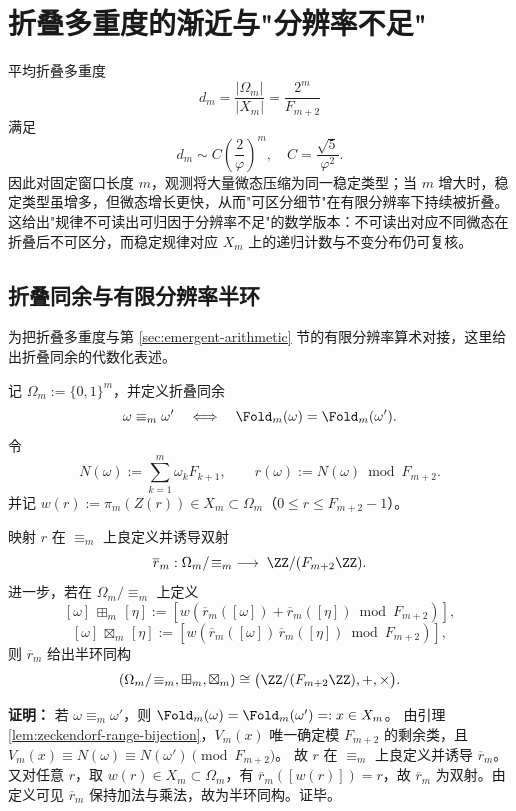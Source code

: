 \section{折叠多重度的渐近与"分辨率不足"}\label{app:fold-multiplicity}\label{app:fold_multiplicity}

平均折叠多重度
\[
d_m=\frac{|\Omega_m|}{|X_m|}=\frac{2^m}{F_{m+2}}
\]
满足
\[
d_m\sim C\left(\frac{2}{\varphi}\right)^m,\quad C=\frac{\sqrt5}{\varphi^2}.
\]
因此对固定窗口长度 $m$，观测将大量微态压缩为同一稳定类型；当 $m$ 增大时，稳定类型虽增多，但微态增长更快，从而"可区分细节"在有限分辨率下持续被折叠。这给出"规律不可读出可归因于分辨率不足"的数学版本：不可读出对应不同微态在折叠后不可区分，而稳定规律对应 $X_m$ 上的递归计数与不变分布仍可复核。

\subsection{折叠同余与有限分辨率半环}
为把折叠多重度与第 \ref{sec:emergent-arithmetic} 节的有限分辨率算术对接，这里给出折叠同余的代数化表述。

\begin{definition}[折叠同余与值模映射]
记 $\Omega_m:=\{0,1\}^m$，并定义折叠同余
\[
\omega\equiv_m\omega'\quad\Longleftrightarrow\quad\Fold_m(\omega)=\Fold_m(\omega').
\]
令
\[
N(\omega):=\sum_{k=1}^m \omega_k F_{k+1},
\qquad
r(\omega):=N(\omega)\bmod F_{m+2}.
\]
并记 $w(r):=\pi_m(Z(r))\in X_m\subset\Omega_m$（$0\le r\le F_{m+2}-1$）。
\end{definition}

\begin{theorem}[折叠同余的模半环表示]
\label{thm:fold-congruence-mod-semirings}
映射 $r$ 在 $\equiv_m$ 上良定义并诱导双射
\[
\overline r_m:\Omega_m/\!\equiv_m\;\longrightarrow\;\ZZ/(F_{m+2}\ZZ).
\]
进一步，若在 $\Omega_m/\!\equiv_m$ 上定义
\[
[\omega]\,\boxplus_m\,[\eta]:=[w(\overline r_m([\omega])\!+\!\overline r_m([\eta])\bmod F_{m+2})],
\]
\[
[\omega]\,\boxtimes_m\,[\eta]:=[w(\overline r_m([\omega])\,\overline r_m([\eta])\bmod F_{m+2})],
\]
则 $\overline r_m$ 给出半环同构
\[
(\Omega_m/\!\equiv_m,\boxplus_m,\boxtimes_m)\cong\bigl(\ZZ/(F_{m+2}\ZZ),+,\times\bigr).
\]
\end{theorem}

\textbf{证明：}
若 $\omega\equiv_m\omega'$，则 $\Fold_m(\omega)=\Fold_m(\omega')=:x\in X_m$。
由引理 \ref{lem:zeckendorf-range-bijection}，$V_m(x)$ 唯一确定模 $F_{m+2}$ 的剩余类，且
\(V_m(x)\equiv N(\omega)\equiv N(\omega')\pmod{F_{m+2}}\)。
故 $r$ 在 $\equiv_m$ 上良定义并诱导 $\overline r_m$。又对任意 $r$，取 $w(r)\in X_m\subset\Omega_m$，有
\(\overline r_m([w(r)])=r\)，故 $\overline r_m$ 为双射。由定义可见 $\overline r_m$ 保持加法与乘法，故为半环同构。证毕。

